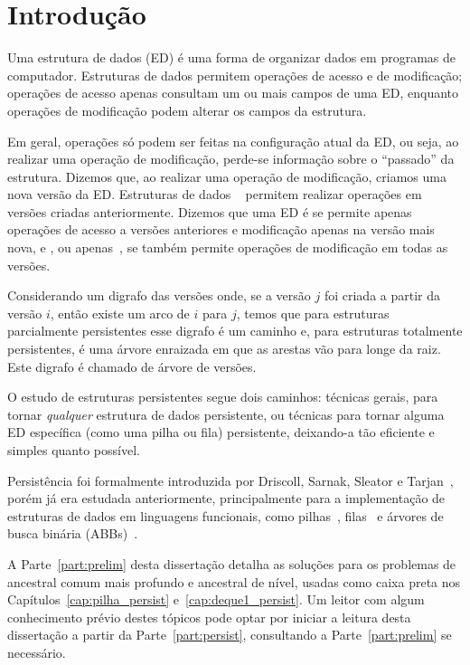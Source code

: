 \documentclass[../../main.tex]{subfiles}
\begin{document}
\setcounter{secnumdepth}{0}

\chapter*{Introdução}

Uma estrutura de dados (ED) é uma forma de organizar dados em programas de computador. Estruturas de dados permitem operações de acesso e de modificação; operações de acesso apenas consultam um ou mais campos de uma ED, enquanto operações de modificação podem alterar os campos da estrutura.

Em geral, operações só podem ser feitas na configuração atual da ED, ou seja, ao realizar uma operação de modificação, perde-se informação sobre o ``passado'' da estrutura. Dizemos que, ao realizar uma operação de modificação, criamos uma nova versão da ED. Estruturas de dados ~\cite{DriscollSST1989} permitem realizar operações em versões criadas anteriormente. Dizemos que uma ED é  se permite apenas operações de acesso a versões anteriores e modificação apenas na versão mais nova, e , ou apenas~, se também permite operações de modificação em todas as versões.

Considerando um digrafo das versões onde, se a versão $j$ foi criada a partir da versão $i$, então existe um arco de $i$ para $j$, temos que para estruturas parcialmente persistentes esse digrafo é um caminho e, para estruturas totalmente persistentes, é uma árvore enraizada em que as arestas vão para longe da raiz. Este digrafo é chamado de árvore de versões.

O estudo de estruturas persistentes segue dois caminhos: técnicas gerais, para tornar \emph{qualquer} estrutura de dados persistente, ou técnicas para tornar alguma ED específica (como uma pilha ou fila) persistente, deixando-a tão eficiente e simples quanto possível.

Persistência foi formalmente introduzida por Driscoll, Sarnak, Sleator e Tarjan~\cite{DriscollSST1989}, porém já era estudada anteriormente, principalmente para a implementação de estruturas de dados em linguagens funcionais, como pilhas~\cite{Myers83}, filas~\cite{HoodMelville} e árvores de busca binária (ABBs)~\cite{Myers82}.

A Parte~\ref{part:prelim} desta dissertação detalha as soluções para os problemas de ancestral comum mais profundo e ancestral de nível, usadas como caixa preta nos Capítulos~\ref{cap:pilha_persist} e~\ref{cap:deque1_persist}. Um leitor com algum conhecimento prévio destes tópicos pode optar por iniciar a leitura desta dissertação a partir da Parte~\ref{part:persist}, consultando a Parte~\ref{part:prelim} se necessário.
\end{document}
